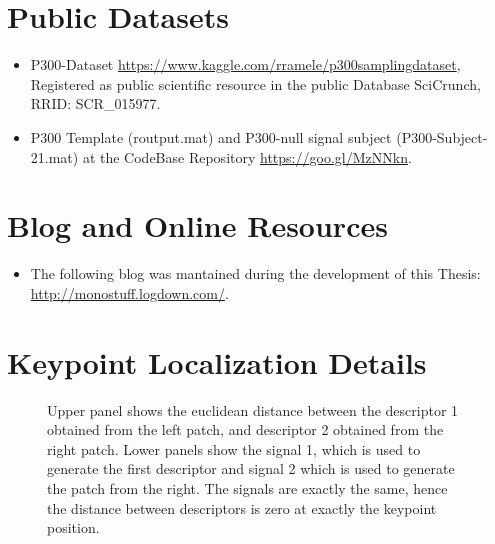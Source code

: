 \section{Public Datasets}

\begin{itemize}
\item P300-Dataset \url{https://www.kaggle.com/rramele/p300samplingdataset}, Registered as public scientific resource in the public Database SciCrunch, RRID: SCR\_015977. 
\item P300 Template (routput.mat) and P300-null signal subject (P300-Subject-21.mat) at the CodeBase Repository \url{https://goo.gl/MzNNkn}.
\end{itemize}

\section{Blog and Online Resources}

\begin{itemize}
\item The following blog was mantained during the development of this Thesis: \url{http://monostuff.logdown.com/}.
\end{itemize}

\section{Keypoint Localization Details}

\begin{figure}[h!]
\centering
{}
\caption[Patch localization on a nonmodified signal]{Upper panel shows the euclidean distance between the descriptor 1 obtained from the left patch, and descriptor 2 obtained from the right patch.  Lower panels show the signal 1, which is used to generate the first descriptor and signal 2 which is used to generate the patch from the right.  The signals are exactly the same, hence the distance between descriptors is zero at exactly the keypoint position.}
\label{fig:dialdescriptors1}
\end{figure}


